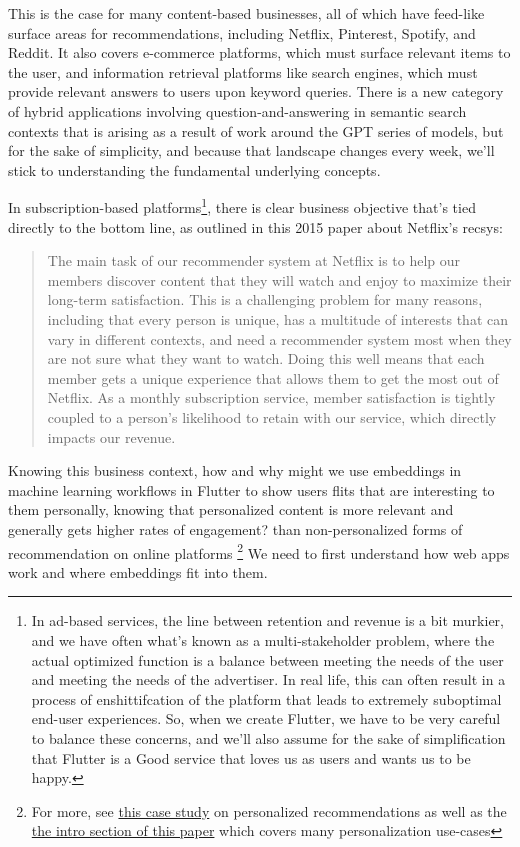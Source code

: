 \documentclass[11pt, table]{diazessay} %
\begin{document}
\begin{sloppypar}
This is the case for many content-based businesses, all of which have feed-like surface areas for recommendations, including Netflix, Pinterest, Spotify, and Reddit.  It also covers e-commerce platforms, which must surface relevant items to the user, and information retrieval platforms like search engines, which must provide relevant answers to users upon keyword queries. There is a new category of hybrid applications involving question-and-answering in semantic search contexts that is arising as a result of work around the GPT series of models, but for the sake of simplicity, and because that landscape changes every week, we'll stick to understanding the fundamental underlying concepts. 

In subscription-based platforms\footnote{In ad-based services, the line between retention and revenue is a bit murkier, and we have often what's known as a multi-stakeholder problem, where the actual optimized function is a balance between meeting the needs of the user and meeting the needs of the advertiser\citep{zheng2017multi}.  In real life, this can often result in a process of enshittifcation\citep{doctorow_2023} of the platform that leads to extremely suboptimal end-user experiences. So, when we create Flutter, we have to be very careful to balance these concerns, and we'll also assume for the sake of simplification that Flutter is a Good service that loves us as users and wants us to be happy.}, there is clear business objective that's tied directly to the bottom line, as outlined in this 2015 paper \citep{steck2021deep}  about Netflix's recsys: 

\begin{quote}

The main task of our recommender system at Netflix is to help our members discover content that they will watch and enjoy to maximize their long-term satisfaction. This is a challenging problem for many reasons, including that every person is unique, has a multitude of interests that can vary in different contexts, and need a recommender system most when they are not sure what they want to watch. Doing this well means that each member gets a unique experience that allows them to get the most out of Netflix. As a monthly subscription service, member satisfaction is tightly coupled to a person’s likelihood to retain with our service, which directly impacts our revenue.
\end{quote}

Knowing this business context, how and why might we use embeddings in machine learning workflows in Flutter to show users flits that are interesting to them personally, knowing that personalized content is more relevant and generally gets higher rates of engagement?\citep{jannach2010recommender}  than non-personalized forms of recommendation on online platforms \footnote{For more, see  \href{http://www.recommenderbook.net/media/Recommender_Systems_An_Introduction_Chapter08_Case_study.pdf}{this case study} on personalized recommendations as well as  the \href{https://www.arxiv-vanity.com/papers/1906.03109/}{the intro section of this paper} which covers many personalization use-cases}  We need to first understand how web apps work and where embeddings fit into them. 


\end{sloppypar}
\end{document}

